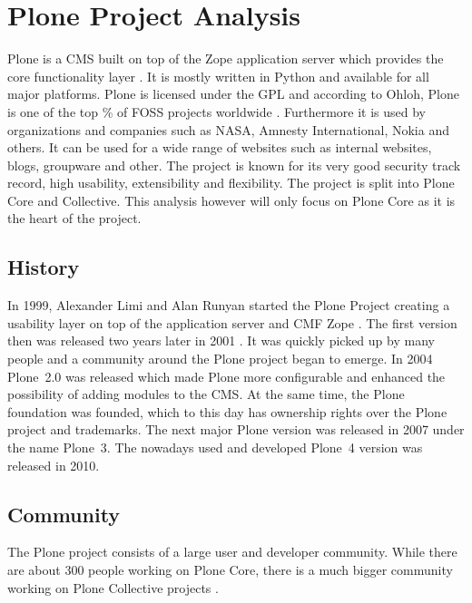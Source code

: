 \section{Plone Project Analysis} %


Plone is a \ac{CMS} built on top of the Zope application server which provides
the core functionality layer \cite{Aspeli2005,PloneFaq,PloneWhatIsPlone}. It is
mostly written in Python and available for all major platforms. Plone is
licensed under the \ac{GPL} and according to Ohloh, Plone is one of the top
\unit[2]{\%} of \ac{FOSS} projects worldwide \cite{PloneOhlohFactoids}.
Furthermore it is used by organizations and companies such as NASA, Amnesty
International, Nokia and others. It can be used for a wide range of websites
such as internal websites, blogs, groupware and other. The project is known for
its very good security track record, high usability, extensibility and
flexibility. The project is split into Plone Core and Collective. This analysis
however will only focus on Plone Core as it is the heart of the project.

\subsection{History} %

In 1999, Alexander Limi and Alan Runyan started the Plone Project creating a
usability layer on top of the application server and \ac{CMF} Zope
\cite{Aspeli2005,PloneFaq}. The first version then was released two years later
in 2001 \cite{PloneReleases}. It was quickly picked up by many people and a
community around the Plone project began to emerge. In 2004 Plone~2.0 was
released which made Plone more configurable and enhanced the possibility of
adding modules to the \ac{CMS}. At the same time, the Plone foundation was
founded, which to this day has ownership rights over the Plone project and
trademarks. The next major Plone version was released in 2007 under the name
Plone~3. The nowadays used and developed Plone~4 version was released in 2010.


\subsection{Community} %

The Plone project consists of a large user and developer community. While there
are about 300 people working on Plone Core, there is a much bigger community
working on Plone Collective projects
\cite{Aspeli2005,PloneOhlohFactoids,PloneCommunityProcesses}.

